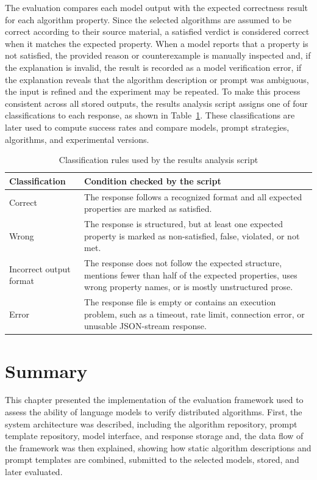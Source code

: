 The evaluation compares each model output with the expected correctness result for each algorithm property. Since the selected algorithms are assumed to be correct according to their source material, a satisfied verdict is considered correct when it matches the expected property. When a model reports that a property is not satisfied, the provided reason or counterexample is manually inspected and, if the explanation is invalid, the result is recorded as a model verification error, if the explanation reveals that the algorithm description or prompt was ambiguous, the input is refined and the experiment may be repeated.
To make this process consistent across all stored outputs, the results analysis script assigns one of four classifications to each response, as shown in Table~\ref{tab:result-classification}. These classifications are later used to compute success rates and compare models, prompt strategies, algorithms, and experimental versions.
\begin{table}[H]
\centering
\renewcommand{\arraystretch}{1.3}
\caption{Classification rules used by the results analysis script}
\label{tab:result-classification}
\begin{tabular}{|>{\raggedright\arraybackslash}p{3.5cm}|
                >{\raggedright\arraybackslash}p{9.5cm}|}
\hline
\textbf{Classification} & \textbf{Condition checked by the script} \\
\hline
Correct & The response follows a recognized format and all expected properties are marked as satisfied. \\
\hline
Wrong & The response is structured, but at least one expected property is marked as non-satisfied, false, violated, or not met. \\
\hline
Incorrect output format & The response does not follow the expected structure, mentions fewer than half of the expected properties, uses wrong property names, or is mostly unstructured prose. \\
\hline
Error & The response file is empty or contains an execution problem, such as a timeout, rate limit, connection error, or unusable JSON-stream response. \\
\hline
\end{tabular}
\end{table}

\section{Summary}

This chapter presented the implementation of the evaluation framework used to assess the ability of language models to verify distributed algorithms. First, the system architecture was described, including the algorithm repository, prompt template repository, model interface, and response storage and, the data flow of the framework was then explained, showing how static algorithm descriptions and prompt templates are combined, submitted to the selected models, stored, and later evaluated.

